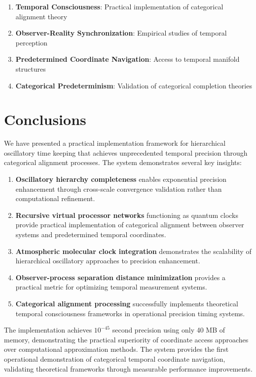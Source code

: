 \documentclass[12pt,a4paper]{article}
\begin{document}
\begin{enumerate}
\item \textbf{Temporal Consciousness}: Practical implementation of categorical alignment theory
\item \textbf{Observer-Reality Synchronization}: Empirical studies of temporal perception
\item \textbf{Predetermined Coordinate Navigation}: Access to temporal manifold structures
\item \textbf{Categorical Predeterminism}: Validation of categorical completion theories
\end{enumerate}

\section{Conclusions}

We have presented a practical implementation framework for hierarchical oscillatory time keeping that achieves unprecedented temporal precision through categorical alignment processes. The system demonstrates several key insights:

\begin{enumerate}
\item \textbf{Oscillatory hierarchy completeness} enables exponential precision enhancement through cross-scale convergence validation rather than computational refinement.

\item \textbf{Recursive virtual processor networks} functioning as quantum clocks provide practical implementation of categorical alignment between observer systems and predetermined temporal coordinates.

\item \textbf{Atmospheric molecular clock integration} demonstrates the scalability of hierarchical oscillatory approaches to precision enhancement.

\item \textbf{Observer-process separation distance minimization} provides a practical metric for optimizing temporal measurement systems.

\item \textbf{Categorical alignment processing} successfully implements theoretical temporal consciousness frameworks in operational precision timing systems.
\end{enumerate}

The implementation achieves $10^{-45}$ second precision using only 40 MB of memory, demonstrating the practical superiority of coordinate access approaches over computational approximation methods. The system provides the first operational demonstration of categorical temporal coordinate navigation, validating theoretical frameworks through measurable performance improvements.
\end{document}
